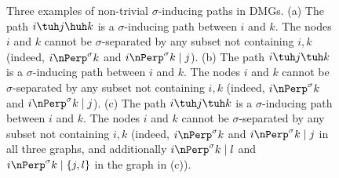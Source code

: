 \begin{figure}\centering
  \caption{Three examples of non-trivial $\sigma$-inducing paths in DMGs. (a) The path $i \tuh j \huh k$ is a $\sigma$-inducing path between $i$ and $k$. The nodes $i$ and $k$ cannot be $\sigma$-separated by any subset not containing $i,k$ (indeed, $i \nPerp^\sigma k$ and $i \nPerp^\sigma k \mid j$). (b) The path $i \tuh j \tuh k$ is a $\sigma$-inducing path between $i$ and $k$. The nodes $i$ and $k$ cannot be $\sigma$-separated by any subset not containing $i,k$ (indeed, $i \nPerp^\sigma k$ and $i \nPerp^\sigma k \mid j$). (c) The path $i \tuh j \tuh k$ is a $\sigma$-inducing path between $i$ and $k$. The nodes $i$ and $k$ cannot be $\sigma$-separated by any subset not containing $i,k$ (indeed, $i \nPerp^\sigma k$ and $i \nPerp^\sigma k \mid j$ in all three graphs, and additionally $i \nPerp^\sigma k \mid l$ and $i \nPerp^\sigma k \mid \{j,l\}$ in the graph in (c)).\label{fig:sigma-inducing_path}}
\end{figure}

